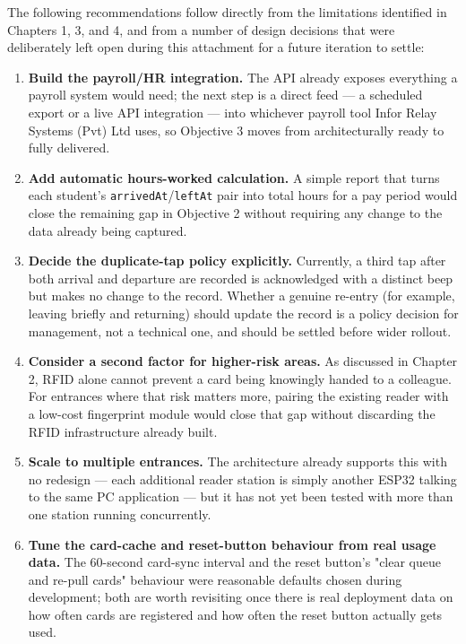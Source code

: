 The following recommendations follow directly from the limitations identified in Chapters 1, 3, and 4, and from a number of design decisions that were deliberately left open during this attachment for a future iteration to settle:

\begin{enumerate}[label=\arabic*.]
    \item \textbf{Build the payroll/HR integration.} The API already exposes everything a payroll system would need; the next step is a direct feed — a scheduled export or a live API integration — into whichever payroll tool Infor Relay Systems (Pvt) Ltd uses, so Objective 3 moves from architecturally ready to fully delivered.
    \item \textbf{Add automatic hours-worked calculation.} A simple report that turns each student's \texttt{arrivedAt}/\texttt{leftAt} pair into total hours for a pay period would close the remaining gap in Objective 2 without requiring any change to the data already being captured.
    \item \textbf{Decide the duplicate-tap policy explicitly.} Currently, a third tap after both arrival and departure are recorded is acknowledged with a distinct beep but makes no change to the record. Whether a genuine re-entry (for example, leaving briefly and returning) should update the record is a policy decision for management, not a technical one, and should be settled before wider rollout.
    \item \textbf{Consider a second factor for higher-risk areas.} As discussed in Chapter 2, RFID alone cannot prevent a card being knowingly handed to a colleague. For entrances where that risk matters more, pairing the existing reader with a low-cost fingerprint module would close that gap without discarding the RFID infrastructure already built.
    \item \textbf{Scale to multiple entrances.} The architecture already supports this with no redesign — each additional reader station is simply another ESP32 talking to the same PC application — but it has not yet been tested with more than one station running concurrently.
    \item \textbf{Tune the card-cache and reset-button behaviour from real usage data.} The 60-second card-sync interval and the reset button's "clear queue and re-pull cards" behaviour were reasonable defaults chosen during development; both are worth revisiting once there is real deployment data on how often cards are registered and how often the reset button actually gets used.
\end{enumerate}

